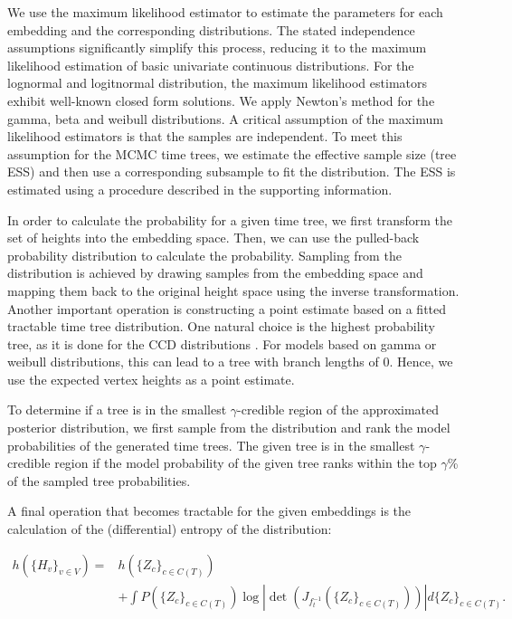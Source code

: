 \documentclass[10pt,letterpaper]{article}
\begin{document}
We use the maximum likelihood estimator to estimate the parameters for each embedding and the corresponding distributions. The stated independence assumptions significantly simplify this process, reducing it to the maximum likelihood estimation of basic univariate continuous distributions. For the lognormal and logitnormal distribution, the maximum likelihood estimators exhibit well-known closed form solutions. We apply Newton's method for the gamma, beta and weibull distributions. A critical assumption of the maximum likelihood estimators is that the samples are independent. To meet this assumption for the MCMC time trees, we estimate the effective sample size (tree ESS) and then use a corresponding subsample to fit the distribution. The ESS is estimated using a procedure described in the supporting information.

In order to calculate the probability for a given time tree, we first transform the set of heights into the embedding space. Then, we can use the pulled-back probability distribution to calculate the probability. Sampling from the distribution is achieved by drawing samples from the embedding space and mapping them back to the original height space using the inverse transformation. Another important operation is constructing a point estimate based on a fitted tractable time tree distribution. One natural choice is the highest probability tree, as it is done for the CCD distributions \cite{ccd}. For models based on gamma or weibull distributions, this can lead to a tree with branch lengths of $0$. Hence, we use the expected vertex heights as a point estimate.

To determine if a tree is in the smallest $\gamma$-credible region of the approximated posterior distribution, we first sample from the distribution and rank the model probabilities of the generated time trees. The given tree is in the smallest $\gamma$-credible region if the model probability of the given tree ranks within the top $\gamma$\% of the sampled tree probabilities.

A final operation that becomes tractable for the given embeddings is the calculation of the (differential) entropy of the distribution:

\begin{equation*}
	\begin{split}
		h(\{H_v\}_{v \in V}) = &h(\{Z_c\}_{c \in C(T)}) \\
		& + \int P(\{Z_c\}_{c \in C(T)}) \log \left| \det{\left(J_{f_t^{-1}}(\{Z_c\}_{c \in C(T)})\right)} \right| d \{Z_c\}_{c \in C(T)}.
	\end{split}
\end{equation*}
\end{document}
